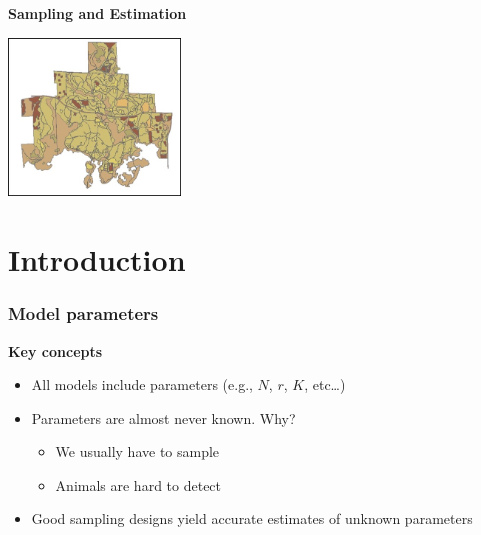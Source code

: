 \documentclass[color=usenames,dvipsnames]{beamer}\usepackage[]{graphicx}\usepackage[]{color}
\begin{document}
\begin{frame}[plain]
  \begin{center}
    {\huge \bf Sampling and Estimation \par}
    \vspace{0.5cm}
    \vfill
      \includegraphics[height=4.2cm,keepaspectratio]{figs/map} \hfill %
  \end{center}
\end{frame}




\section{Introduction}



\begin{frame}
  \frametitle{Model parameters}
  \large
  {\bf Key concepts}
  \begin{itemize}%
    \item<1-> All models include parameters (e.g., $N$, $r$, $K$, etc\dots)
    \item<2-> Parameters are almost never known. Why?
      \begin{itemize}
        \large
        \item<3-> We usually have to sample
        \item<3-> Animals are hard to detect
      \end{itemize}
    \item<4-> Good sampling designs yield accurate %
      estimates of unknown parameters
  \end{itemize}
\end{frame}
\end{document}
